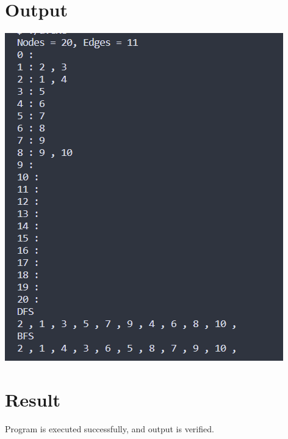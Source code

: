 \section{Output}
\includegraphics[]{Cycle_2/Outputs/GraphAdjList.png}

\section{Result}
Program is executed successfully, and output is verified.
